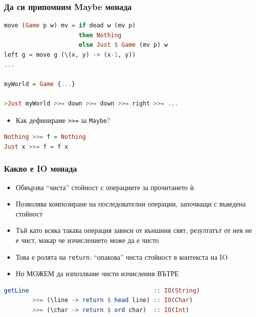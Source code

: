 \documentclass{beamer}
\begin{document}
\begin{frame}[fragile]
  \frametitle{Да си припомним Maybe монада}



\begin{lstlisting}[basicstyle=\small,language=Haskell]
move (Game p w) mv = if dead w (mv p) 
                     then Nothing 
                     else Just $ Game (mv p) w
left g = move g (\(x, y) -> (x-1, y))
...

myWorld = Game {...}

>Just myWorld >>= down >>= down >>= right >>= ...
\end{lstlisting}
\begin{itemize}
  \item Как дефинираме \verb#>>=# за \verb#Maybe#?
\end{itemize}

\begin{lstlisting}[basicstyle=\small,language=Haskell]
Nothing >>= f = Nothing
Just x >>= f = f x
\end{lstlisting}

\end{frame}

\begin{frame}[fragile]
  \frametitle{Какво е IO монада}
\begin{itemize}
  \item Обвързва ``чиста'' стойност с операциите за прочитането ѝ
  \item Позволява композиране на последователни операции, започващи с въведена стойност
  \item Тъй като всяка такава операция зависи от външния свят, резултатът от нея не е чист, макар че изчислението може да е чисто
  \item Това е ролята на \verb#return#: ``опакова'' чиста стойност в контекста на IO
  \item Но МОЖЕМ да изпозлваме чисти изчисления ВЪТРЕ
\end{itemize}
\begin{lstlisting}[basicstyle=\small,language=Haskell]
getLine                                   :: IO(String)
        >>= (\line -> return $ head line) :: IO(Char)
        >>= (\char -> return $ ord char)  :: IO(Int)
\end{lstlisting}
  
\end{frame}
\end{document}
